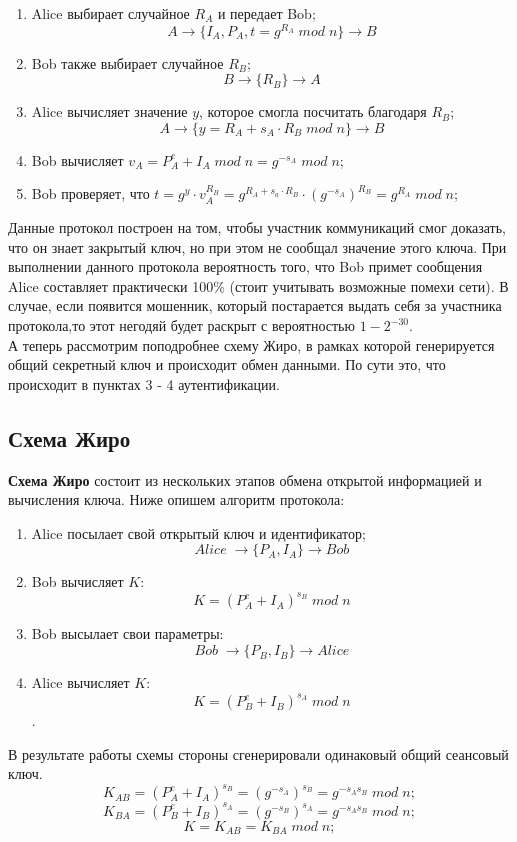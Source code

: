 \documentclass[a4paper]{article}
\begin{document}
    \begin{enumerate}
        \item Alice выбирает случайное $R_A$  и передает Bob; 
        $$A \rightarrow \{I_A, P_A, t = g^{R_A} \; mod \; n\} \rightarrow B $$
        \item Bob также выбирает случайное $R_B$;
        $$B \rightarrow \{R_B\} \rightarrow A $$
        \item Alice вычисляет значение $y$, которое смогла посчитать благодаря $R_B$; $$A \rightarrow \{y = R_A + s_A \cdot R_B \; mod \; n\} \rightarrow B $$
        \item Bob вычисляет $v_A = P_A^e + I_A \; mod \; n  = g^{-s_A} \; mod \; n $;
        \item Bob проверяет, что $t = g^y\cdot v_A^{R_B} = g^{R_A+s_a \cdot R_B}\cdot (g^{-s_A})^{R_B} = g^{R_A}  \; mod \; n$;
    \end{enumerate}

    Данные протокол построен на том, чтобы участник коммуникаций смог доказать, что он знает закрытый ключ, но при этом не сообщал значение этого ключа. При выполнении данного протокола вероятность того, что Bob примет сообщения Alice составляет практически 100\% (стоит учитывать возможные помехи сети).
    В случае, если появится мошенник, который постарается выдать себя за участника протокола,то этот негодяй будет раскрыт с вероятностью $1 - 2^{-30}$. \\
    А теперь рассмотрим поподробнее схему Жиро, в рамках которой генерируется общий секретный ключ и происходит обмен данными. По сути это, что происходит в пунктах 3 - 4 аутентификации.
\subsection{Схема Жиро}
\textbf{Схема Жиро} состоит из нескольких этапов обмена открытой информацией и вычисления ключа. Ниже опишем алгоритм протокола:
\begin{enumerate}
    \item Alice посылает свой открытый ключ и идентификатор; $$Alice \; \rightarrow \{ P_A, I_A\} \rightarrow Bob$$
    \item Bob вычисляет $K$: $$K = (P_A^e + I_A)^{s_B} \; mod \; n$$
    \item Bob высылает свои параметры: $$ Bob \; \rightarrow \{ P_B, I_B\} \rightarrow Alice $$
    \item Alice вычисляет $K$: $$K =(P_B^e + I_B)^{s_A} \; mod \; n$$.
\end{enumerate}
В результате работы схемы стороны сгенерировали одинаковый общий сеансовый ключ.
$$K_{AB} = (P_A^e + I_A)^{s_B} = (g^{-s_A})^{s_B} = g^{-s_As_B} \; mod \; n ;$$
$$K_{BA} = (P_B^e + I_B)^{s_A} = (g^{-s_B})^{s_A} = g^{-s_As_B} \; mod \; n ;$$
$$K = K_{AB} =K_{BA} \; mod \; n ;$$
\end{document}
